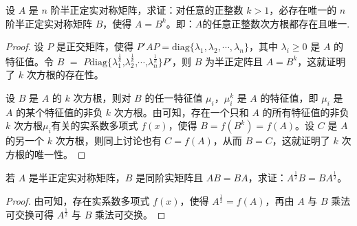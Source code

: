 \documentclass[../../main.tex]{subfiles}%
\begin{document}
\begin{proposition}\label{proposition:例9.61}
设 \(A\) 是 \(n\) 阶半正定实对称矩阵，求证：对任意的正整数 \(k > 1\)，必存在唯一的 \(n\) 阶半正定实对称矩阵 \(B\)，使得 \(A = B^k\)。即：$A$的任意正整数次方根都存在且唯一.
\end{proposition}
\begin{proof}

设 \(P\) 是正交矩阵，使得 \(P'AP = \mathrm{diag}\{\lambda_1,\lambda_2,\cdots,\lambda_n\}\)，其中 \(\lambda_i \geqslant  0\) 是 \(A\) 的特征值。令 $B$ $=$ $P$$\mathrm{diag}$$\{$$\lambda_1^{\frac{1}{k}}$,$\lambda_2^{\frac{1}{k}}$,$\cdots$,$\lambda_n^{\frac{1}{k}}$$\}$$P'$，则 \(B\) 为半正定阵且 \(A = B^k\)，这就证明了 \(k\) 次方根的存在性。

设 \(B\) 是 \(A\) 的 \(k\) 次方根，则对 \(B\) 的任一特征值 \(\mu_i\)，\(\mu_i^k\) 是 \(A\) 的特征值，即 \(\mu_i\) 是 \(A\) 的某个特征值的非负 \(k\) 次方根。由可知，存在一个只和 \(A\) 的所有特征值的非负 \(k\) 次方根$\mu_i$有关的实系数多项式 \(f(x)\)，使得 \(B = f(B^k) = f(A)\)。设 \(C\) 是 \(A\) 的另一个 \(k\) 次方根，则同上讨论也有 \(C = f(A)\)，从而 \(B = C\)，这就证明了 \(k\) 次方根的唯一性。 

\end{proof}

\begin{proposition}\label{proposition:例9.62}
若 \(A\) 是半正定实对称矩阵，\(B\) 是同阶实矩阵且 \(AB = BA\)，求证：\(A^{\frac{1}{2}}B = BA^{\frac{1}{2}}\)。
\end{proposition}
\begin{proof}

由可知，存在实系数多项式 \(f(x)\)，使得 \(A^{\frac{1}{2}} = f(A)\)，再由 \(A\) 与 \(B\) 乘法可交换可得 \(A^{\frac{1}{2}}\) 与 \(B\) 乘法可交换。

\end{proof}
\end{document}
